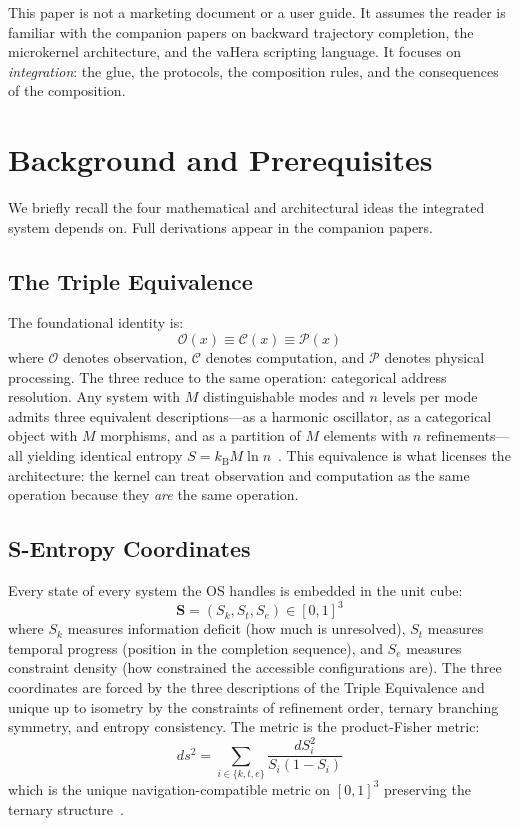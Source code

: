 \documentclass[11pt,twocolumn,a4paper]{article}
\newcommand{\Scoord}{\mathbf{S}}
\newcommand{\Skk}{S_k}
\newcommand{\Stt}{S_t}
\newcommand{\See}{S_e}
\newcommand{\kb}{k_{\mathrm{B}}}
\begin{document}
This paper is not a marketing document or a user guide. It assumes the reader is familiar with the companion papers on backward trajectory completion, the microkernel architecture, and the vaHera scripting language. It focuses on \emph{integration}: the glue, the protocols, the composition rules, and the consequences of the composition.


\section{Background and Prerequisites}
\label{sec:background}

We briefly recall the four mathematical and architectural ideas the integrated system depends on. Full derivations appear in the companion papers.

\subsection{The Triple Equivalence}

The foundational identity is:
\begin{equation}
\mathcal{O}(x) \equiv \mathcal{C}(x) \equiv \mathcal{P}(x)
\label{eq:triple}
\end{equation}
where $\mathcal{O}$ denotes observation, $\mathcal{C}$ denotes computation, and $\mathcal{P}$ denotes physical processing. The three reduce to the same operation: categorical address resolution. Any system with $M$ distinguishable modes and $n$ levels per mode admits three equivalent descriptions---as a harmonic oscillator, as a categorical object with $M$ morphisms, and as a partition of $M$ elements with $n$ refinements---all yielding identical entropy $S = \kb M \ln n$~\cite{shannon1948mathematical,jaynes1957information}. This equivalence is what licenses the architecture: the kernel can treat observation and computation as the same operation because they \emph{are} the same operation.

\subsection{S-Entropy Coordinates}

Every state of every system the OS handles is embedded in the unit cube:
\begin{equation}
\Scoord = (\Skk, \Stt, \See) \in [0,1]^3
\end{equation}
where $\Skk$ measures information deficit (how much is unresolved), $\Stt$ measures temporal progress (position in the completion sequence), and $\See$ measures constraint density (how constrained the accessible configurations are). The three coordinates are forced by the three descriptions of the Triple Equivalence and unique up to isometry by the constraints of refinement order, ternary branching symmetry, and entropy consistency. The metric is the product-Fisher metric:
\begin{equation}
ds^2 = \sum_{i \in \{k,t,e\}} \frac{dS_i^2}{S_i(1 - S_i)}
\label{eq:metric}
\end{equation}
which is the unique navigation-compatible metric on $[0,1]^3$ preserving the ternary structure~\cite{fisher1922mathematical,rao1945information,amari1985differential,chentsov1972statistical}.
\end{document}
